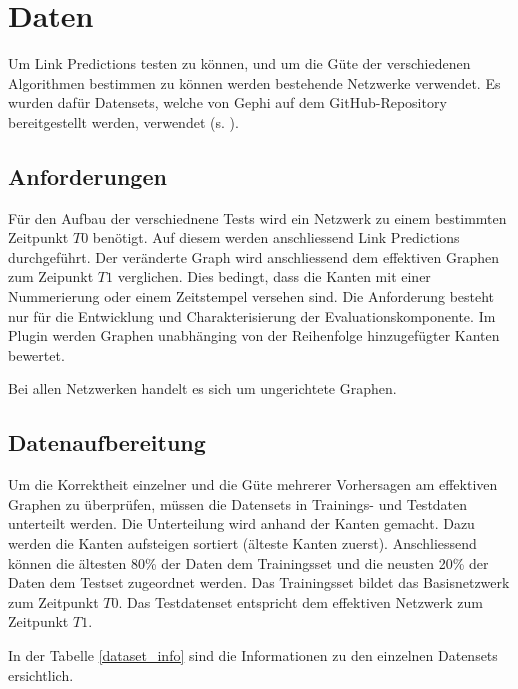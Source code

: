 \chapter{Daten}
Um Link Predictions testen zu können, und um die Güte der verschiedenen Algorithmen bestimmen zu können werden bestehende Netzwerke verwendet.
Es wurden dafür Datensets, welche von Gephi auf dem GitHub-Repository bereitgestellt werden, verwendet (s. \cite{moll_datasets_2018}).

\section{Anforderungen}
Für den Aufbau der verschiednene Tests wird ein Netzwerk zu einem bestimmten Zeitpunkt $T0$ benötigt.
Auf diesem werden anschliessend Link Predictions durchgeführt.
Der veränderte Graph wird anschliessend dem effektiven Graphen zum Zeipunkt $T1$ verglichen.
Dies bedingt, dass die Kanten mit einer Nummerierung oder einem Zeitstempel versehen sind.
Die Anforderung besteht nur für die Entwicklung und Charakterisierung der Evaluationskomponente.
Im Plugin werden Graphen unabhänging von der Reihenfolge hinzugefügter Kanten bewertet.

Bei allen Netzwerken handelt es sich um ungerichtete Graphen.

\section{Datenaufbereitung}
Um die Korrektheit einzelner und die Güte mehrerer Vorhersagen am effektiven Graphen zu überprüfen, müssen die Datensets in Trainings- und Testdaten unterteilt werden.
Die Unterteilung wird anhand der Kanten gemacht. Dazu werden die Kanten aufsteigen sortiert (älteste Kanten zuerst).
Anschliessend können die ältesten 80\% der Daten dem Trainingsset und die neusten 20\% der Daten dem Testset zugeordnet werden.
Das Trainingsset bildet das Basisnetzwerk zum Zeitpunkt $T0$.
Das Testdatenset entspricht dem effektiven Netzwerk zum Zeitpunkt $T1$.

In der Tabelle \ref{dataset_info} sind die Informationen zu den einzelnen Datensets ersichtlich.

